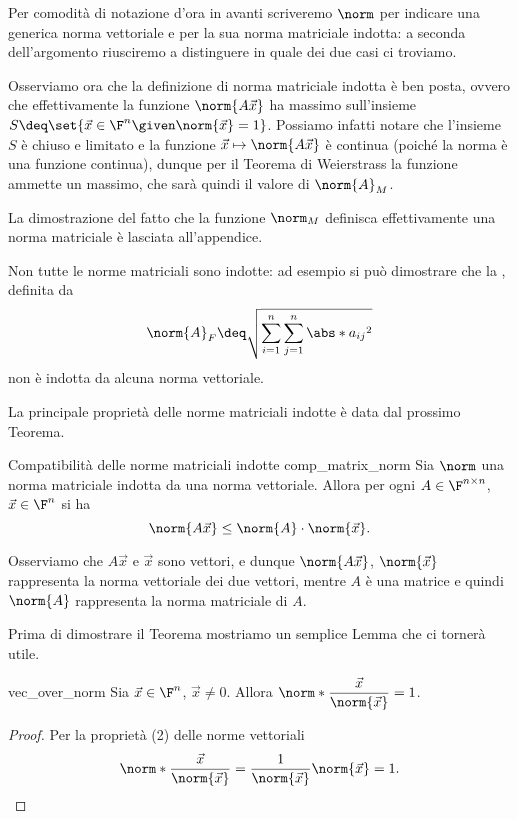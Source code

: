 Per comodità di notazione d'ora in avanti scriveremo $\norm$ per indicare una generica norma vettoriale e per la sua norma matriciale indotta: a seconda dell'argomento riusciremo a distinguere in quale dei due casi ci troviamo.

Osserviamo ora che la definizione di norma matriciale indotta è ben posta, ovvero che effettivamente la funzione $\norm{A\vec x}$ ha massimo sull'insieme $S \deq \set{\vec x \in \F^n \given \norm{\vec x} = 1}$. 
Possiamo infatti notare che l'insieme $S$ è chiuso e limitato e la funzione $\vec x \mapsto \norm{A\vec x}$ è continua (poiché la norma è una funzione continua), dunque per il Teorema di Weierstrass la funzione ammette un massimo, che sarà quindi il valore di $\norm{A}_M$.

La dimostrazione del fatto che la funzione $\norm_M$ definisca effettivamente una norma matriciale è lasciata all'appendice.

\begin{remark}
    Non tutte le norme matriciali sono indotte: ad esempio si può dimostrare che la , definita da \[
        \norm{A}_F \deq \sqrt{\sum_{i=1}^n\sum_{j=1}^n \abs*{a_{ij}}^2}
    \] non è indotta da alcuna norma vettoriale.
\end{remark}

La principale proprietà delle norme matriciali indotte è data dal prossimo Teorema.
\begin{theorem}
    {Compatibilità delle norme matriciali indotte}
    {comp_matrix_norm}
    Sia $\norm$ una norma matriciale indotta da una norma vettoriale. Allora per ogni $A \in \Mat{\F, n, n}$, $\vec x \in \F^n$ si ha \[
        \norm{A\vec x} \leq \norm{A} \cdot \norm{\vec x}.
    \] 
\end{theorem}

Osserviamo che $A\vec x$ e $\vec x$ sono vettori, e dunque $\norm{A\vec x}$, $\norm{\vec x}$ rappresenta la norma vettoriale dei due vettori, mentre $A$ è una matrice e quindi $\norm{A}$ rappresenta la norma matriciale di $A$. 

Prima di dimostrare il Teorema mostriamo un semplice Lemma che ci tornerà utile.
\begin{lemma}
    {}{vec_over_norm}
    Sia $\vec x \in \F^n$, $\vec x \neq 0$. Allora $\norm*{\dfrac{\vec x}{\norm{\vec x}}} = 1$.  
\end{lemma}
\begin{proof}
    Per la proprietà (2) delle norme vettoriali \[
        \norm*{\frac{\vec x}{\norm{\vec x}}} = \frac1{\norm{\vec x}} \norm{\vec x} = 1. \qedhere
    \]
\end{proof}

